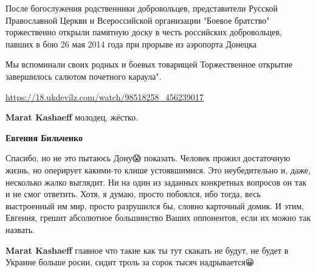 \begin{itemize}
\begin{itemize}
После богослужения родственники добровольцев, представители Русской
Православной Церкви и Всероссийской организации "Боевое братство" торжественно
открыли памятную доску в честь российских добровольцев, павших в бою 26 мая
2014 года при прорыве из аэропорта Донецка

Мы вспоминали своих родных и боевых товарищей Торжественное открытие
завершилось салютом почетного караула". 

\url{https://18.ukdevilz.com/watch/98518258_456239017}

 
\textbf{Marat Kashaeff} молодец, жёстко.

 
\textbf{Евгения Бильченко} 

Спасибо, но не это пытаюсь Дону😱 показать. Человек прожил достаточную жизнь,
но оперирует какими-то клише устоявшимися. Это неубедительно и, даже, несколько
жалко выглядит. Ни на один из заданных конкретных вопросов он так и не смог
ответить. Хотя, я думаю, просто побоялся, ибо тогда, весь выстроенный им мир,
просто разрушился бы, словно карточный домик. И этим, Евгения, грешит
абсолютное большинство Ваших оппонентов, если их можно так назвать.


 
\textbf{Marat Kashaeff} главное что такие как ты тут скакать не будут, не будет
в Украине больше росии, сидит троль за сорок тысяч надрывается😀

 

\end{itemize}
\end{itemize}
